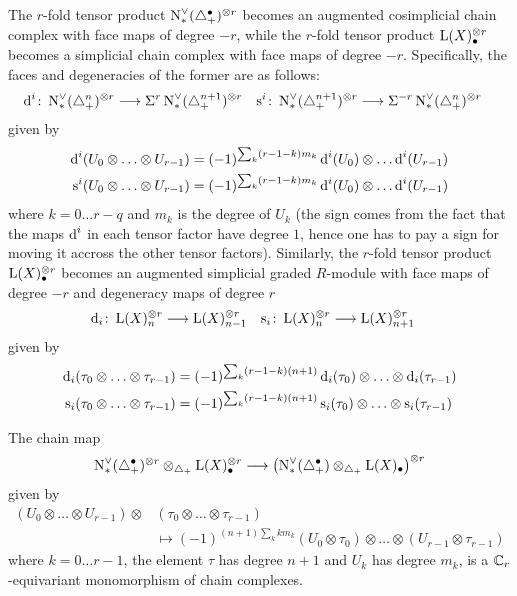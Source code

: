 The $r$-fold tensor product $\operatorname{N}^\vee_{*}(\triangle_{+}^\bullet)^{\otimes r}$ becomes an augmented cosimplicial chain complex with face maps of degree $-r$, while the $r$-fold tensor product $\operatorname{L}(X)_\bullet^{\otimes r}$ becomes a simplicial chain complex with face maps of degree $-r$. Specifically, the faces and degeneracies of the former are as follows:
\begin{align*}
	\operatorname{d}^i\colon \operatorname{N}^\vee_{*}(\triangle_{+}^n)^{\otimes r}&\longrightarrow \Sigma^{r}\operatorname{N}^\vee_{*}(\triangle_{+}^{n+1})^{\otimes r}
	&
	\operatorname{s}^i\colon \operatorname{N}^\vee_{*}(\triangle_{+}^{n+1})^{\otimes r}&\longrightarrow \Sigma^{-r}\operatorname{N}^\vee_{*}(\triangle_{+}^{n})^{\otimes r}
\end{align*}
given by
\begin{align*}
	\operatorname{d}^i(U_0\otimes \ldots\otimes U_{r-1}) &= (-1)^{\sum_k (r-1-k)m_k}\operatorname{d}^i(U_0)\otimes \ldots \operatorname{d}^i(U_{r-1})
	\\
	\operatorname{s}^i(U_0\otimes \ldots\otimes U_{r-1}) &= (-1)^{\sum_k (r-1-k)m_k}\operatorname{d}^i(U_0)\otimes \ldots \operatorname{d}^i(U_{r-1})
\end{align*}
where $k = 0\ldots r-q$ and $m_k$ is the degree of $U_k$ (the sign comes from the fact that the maps $\operatorname{d}^i$ in each tensor factor have degree $1$, hence one has to pay a sign for moving it accross the other tensor factors). Similarly, the $r$-fold tensor product $\operatorname{L}(X)^{\otimes r}_{\bullet}$ becomes an augmented simplicial graded $R$-module with face maps of degree $-r$ and degeneracy maps of degree $r$
\begin{align*}
	\operatorname{d}_i\colon \operatorname{L}(X)_n^{\otimes r} &\longrightarrow \operatorname{L}(X)_{n-1}^{\otimes r}
	&
	\operatorname{s}_i\colon \operatorname{L}(X)_n^{\otimes r} &\longrightarrow \operatorname{L}(X)_{n+1}^{\otimes r}
\end{align*}
given by
\begin{align*}
	\operatorname{d}_i(\tau_0\otimes \ldots\otimes \tau_{r-1}) &= (-1)^{\sum_k (r-1-k)(n+1)} \operatorname{d}_i(\tau_0)\otimes \ldots \otimes \operatorname{d}_i(\tau_{r-1})
\\
	\operatorname{s}_i(\tau_0\otimes \ldots\otimes \tau_{r-1}) &= (-1)^{\sum_k (r-1-k)(n+1)} \operatorname{s}_i(\tau_0)\otimes \ldots \otimes \operatorname{s}_i(\tau_{r-1})
	\end{align*}
\begin{lemma}\label{lemma:3}
	The chain map
	\[\operatorname{N}^\vee_{*}(\triangle_{+}^\bullet)^{\otimes r}\otimes_{\triangle_{+}} \operatorname{L}(X)_\bullet^{\otimes r}\longrightarrow \left(\operatorname{N}^\vee_{*}(\triangle_{+}^\bullet)\otimes_{\triangle_{+}} \operatorname{L}(X)_\bullet\right)^{\otimes r}\]
	given by
	\begin{align*}
		(U_0\otimes \ldots\otimes U_{r-1})\otimes &(\tau_0\otimes\ldots\otimes \tau_{r-1})
	\\
  &\mapsto (-1)^{(n+1)\sum_{k} km_k}(U_0\otimes\tau_0)\otimes \ldots\otimes (U_{r-1}\otimes \tau_{r-1})
	\end{align*}
where $k=0\ldots r-1$, the element $\tau$ has degree $n+1$ and $U_k$ has degree $m_k$, is a $\mathbb{C}_r$-equivariant monomorphism of chain complexes.
\end{lemma}
